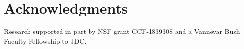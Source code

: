 
\section*{Acknowledgments}

Research supported in part by NSF grant CCF-1839308 and a 
Vannevar Bush Faculty Fellowship to JDC.
